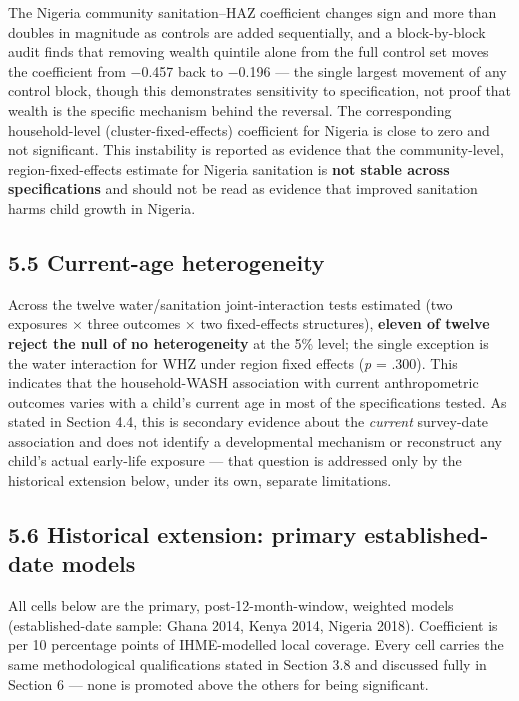 The Nigeria community sanitation--HAZ coefficient changes sign and more than doubles in magnitude as controls are added sequentially, and a block-by-block audit finds that removing wealth quintile alone from the full control set moves the coefficient from −0.457 back to −0.196 --- the single largest movement of any control block, though this demonstrates sensitivity to specification, not proof that wealth is the specific mechanism behind the reversal. The corresponding household-level (cluster-fixed-effects) coefficient for Nigeria is close to zero and not significant. This instability is reported as evidence that the community-level, region-fixed-effects estimate for Nigeria sanitation is \textbf{not stable across specifications} and should not be read as evidence that improved sanitation harms child growth in Nigeria.

\subsection*{5.5 Current-age heterogeneity}

Across the twelve water/sanitation joint-interaction tests estimated (two exposures × three outcomes × two fixed-effects structures), \textbf{eleven of twelve reject the null of no heterogeneity} at the 5\% level; the single exception is the water interaction for WHZ under region fixed effects (\textit{p} = .300). This indicates that the household-WASH association with current anthropometric outcomes varies with a child's current age in most of the specifications tested. As stated in Section 4.4, this is secondary evidence about the \textit{current} survey-date association and does not identify a developmental mechanism or reconstruct any child's actual early-life exposure --- that question is addressed only by the historical extension below, under its own, separate limitations.

\subsection*{5.6 Historical extension: primary established-date models}

All cells below are the primary, post-12-month-window, weighted models (established-date sample: Ghana 2014, Kenya 2014, Nigeria 2018). Coefficient is per 10 percentage points of IHME-modelled local coverage. Every cell carries the same methodological qualifications stated in Section 3.8 and discussed fully in Section 6 --- none is promoted above the others for being significant.

